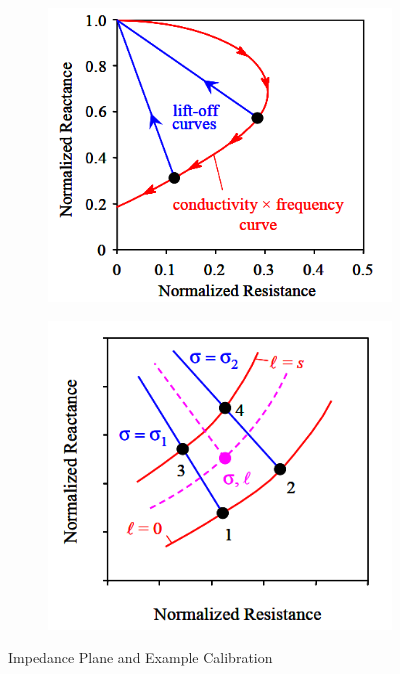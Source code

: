 \documentclass[a4paper,twoside,11pt]{article}
\begin{document}
\begin{figure}[H]
	\centering
	
	\begin{subfigure}[b]{0.3\textwidth}
		\centering
		\includegraphics[width=\textwidth]{Capture}
		\caption{}
		\label{fig:3A}
	\end{subfigure}
	\quad
	\begin{subfigure}[b]{0.3\textwidth}
		\centering
		\includegraphics[width=\textwidth]{Capture2}
		\caption{}
		\label{fig:3B}
	\end{subfigure}
\caption{Impedance Plane and Example Calibration \cite{nagyElectromagneticNDE2019}}
\label{fig:x cubed graph}
\end{figure}
\end{document}
